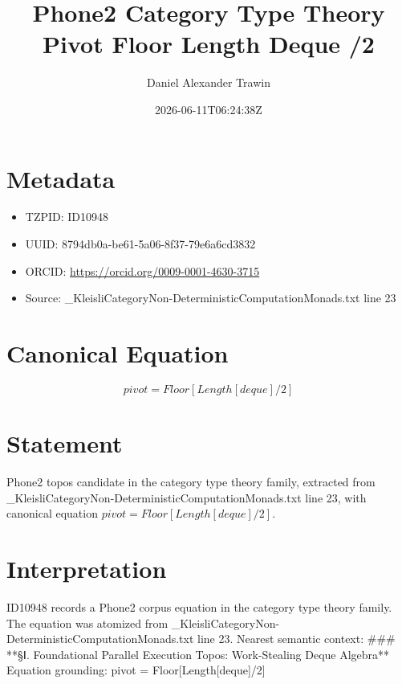 \documentclass[11pt]{article}
\title{Phone2 Category Type Theory Pivot Floor Length Deque /2}
\author{Daniel Alexander Trawin}
\date{2026-06-11T06:24:38Z}
\begin{document}
\maketitle
\section*{Metadata}
\begin{itemize}
\item TZPID: ID10948
\item UUID: 8794db0a-be61-5a06-8f37-79e6a6cd3832
\item ORCID: \url{https://orcid.org/0009-0001-4630-3715}
\item Source: _KleisliCategoryNon-DeterministicComputationMonads.txt line 23
\end{itemize}
\section*{Canonical Equation}
\[
pivot = Floor[Length[deque]/2]
\]
\section*{Statement}
Phone2 topos candidate in the category type theory family, extracted from _KleisliCategoryNon-DeterministicComputationMonads.txt line 23, with canonical equation $pivot = Floor[Length[deque]/2]$.
\section*{Interpretation}
ID10948 records a Phone2 corpus equation in the category type theory family. The equation was atomized from _KleisliCategoryNon-DeterministicComputationMonads.txt line 23. Nearest semantic context: ### **§Ⅰ. Foundational Parallel Execution Topos: Work-Stealing Deque Algebra** Equation grounding: pivot = Floor[Length[deque]/2]
\end{document}
